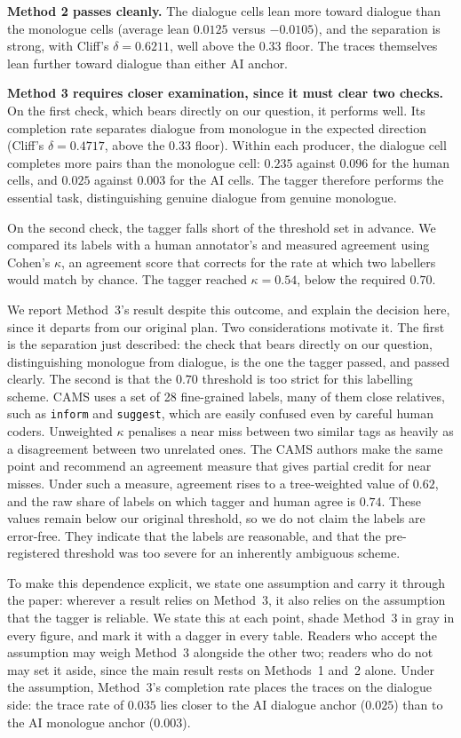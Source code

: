 \documentclass[10pt,twocolumn]{article}
\begin{document}
\textbf{Method 2 passes cleanly.} The dialogue cells lean more toward dialogue than the monologue
cells (average lean $0.0125$ versus $-0.0105$), and the separation is strong, with Cliff's
$\delta=0.6211$, well above the $0.33$ floor. The traces themselves lean further toward dialogue than
either AI anchor.

\textbf{Method 3 requires closer examination, since it must clear two checks.} On the first check,
which bears directly on our question, it performs well. Its completion rate separates dialogue from
monologue in the expected direction (Cliff's $\delta=0.4717$, above the $0.33$ floor). Within each
producer, the dialogue cell completes more pairs than the monologue cell: $0.235$ against $0.096$ for
the human cells, and $0.025$ against $0.003$ for the AI cells. The tagger therefore performs the
essential task, distinguishing genuine dialogue from genuine monologue.

On the second check, the tagger falls short of the threshold set in advance. We compared its labels
with a human annotator's and measured agreement using Cohen's $\kappa$, an agreement score that
corrects for the rate at which two labellers would match by chance. The tagger reached $\kappa=0.54$,
below the required $0.70$.

We report Method~3's result despite this outcome, and explain the decision here, since it departs from
our original plan. Two considerations motivate it. The first is the separation just described: the
check that bears directly on our question, distinguishing monologue from dialogue, is the one the
tagger passed, and passed clearly. The second is that the $0.70$ threshold is too strict for this
labelling scheme. CAMS uses a set of 28 fine-grained labels, many of them close relatives, such as
\texttt{inform} and \texttt{suggest}, which are easily confused even by careful human coders.
Unweighted $\kappa$ penalises a near miss between two similar tags as heavily as a disagreement
between two unrelated ones. The CAMS authors make the same point and recommend an agreement measure
that gives partial credit for near misses. Under such a measure, agreement rises to a tree-weighted
value of $0.62$, and the raw share of labels on which tagger and human agree is $0.74$. These values
remain below our original threshold, so we do not claim the labels are error-free. They indicate that
the labels are reasonable, and that the pre-registered threshold was too severe for an inherently
ambiguous scheme.

To make this dependence explicit, we state one assumption and carry it through the paper: wherever a
result relies on Method~3, it also relies on the assumption that the tagger is reliable. We state this
at each point, shade Method~3 in gray in every figure, and mark it with a dagger in every table.
Readers who accept the assumption may weigh Method~3 alongside the other two; readers who do not may
set it aside, since the main result rests on Methods~1 and~2 alone. Under the assumption, Method~3's
completion rate places the traces on the dialogue side: the trace rate of $0.035$ lies closer to the
AI dialogue anchor ($0.025$) than to the AI monologue anchor ($0.003$).
\end{document}
